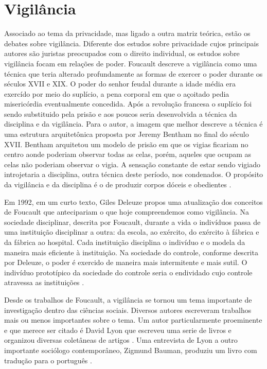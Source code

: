 \section{Vigilância}
\label{sec:vigilancia}

Associado ao tema da privacidade, mas ligado a outra matriz teórica, estão os debates sobre vigilância.
Diferente dos estudos sobre privacidade cujos principais autores são juristas preocupados com o direito individual, os estudos sobre vigilância focam em relações de poder.
Foucault descreve a vigilância como uma técnica que teria alterado profundamente as formas de exercer o poder durante os séculos XVII e XIX.
O poder do senhor feudal durante a idade média era exercído por meio do suplício, a pena corporal em que o açoitado pedia misericórdia eventualmente concedida.
Após a revolução francesa o suplício foi sendo substituido pela prisão e aos poucos seria desenvolvida a técnica da disciplina e da vigilância.
Para o autor, a imagem que melhor descreve a técnica é uma estrutura arquitetônica proposta por Jeremy Bentham no final do século XVII.
Bentham arquitetou um modelo de prisão em que os vigias ficariam no centro aonde poderiam observar todas as celas, porém, aqueles que ocupam as celas não poderiam observar o vigia.
A sensação constante de estar sendo vigiado introjetaria a disciplina, outra técnica deste período, nos condenados.
O propósito da vigilância e da disciplina é o de produzir corpos dóceis e obedientes \cite{Foucault96}.

Em 1992, em um curto texto, Giles Deleuze propos uma atualização dos conceitos de Foucault que antecipariam o que hoje compreendemos como vigilância.
Na sociedade disciplinar, descrita por Foucault, durante a vida o indivíduos passa de uma instituição disciplinar a outra: da escola, ao exército, do exército à fábrica e da fábrica ao hospital.
Cada instituição disciplina o indivíduo e o modela da maneira mais eficiente à instituição.
Na sociedade do controle, conforme descrita por Deleuze, o poder é exercido de maneira mais intermitente e mais sutil.
O indivíduo prototípico da sociedade do controle seria o endividado cujo controle atravessa as instituições \cite{Deleuze92}.

Desde os trabalhos de Foucault, a vigilância se tornou um tema importante de investigação dentro das ciências sociais.
Diversos autores escreveram trabalhos mais ou menos importantes sobre o tema.
Um autor particularmente proeminente e que merece ser citado é David Lyon que escreveu uma serie de livros e organizou diversas coletâneas de artigos \cite{Lyon94,Lyon05}.
Uma entrevista de Lyon a outro importante sociólogo contemporâneo, Zigmund Bauman, produziu um livro com tradução para o português \cite{Bauman14}. 

